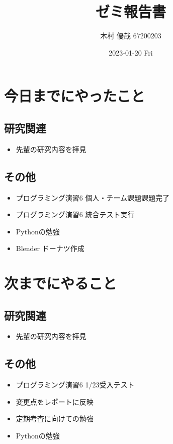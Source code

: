 \documentclass[uplatex, onecolumn, 10pt]{jsarticle}
\begin{document}
\title{\vspace{-40mm}\bf{\LARGE{ゼミ報告書}}}
\author{\vspace{-40mm}木村 優哉 67200203}
\date{2023-01-20 Fri}
\maketitle


\section{今日までにやったこと}

\subsection*{研究関連}
\begin{itemize}
	\item 先輩の研究内容を拝見
\end{itemize}

\subsection*{その他}
\begin{itemize}
	\item プログラミング演習6 個人・チーム課題課題完了
	\item プログラミング演習6 統合テスト実行
	\item Pythonの勉強
	\item Blender ドーナツ作成
\end{itemize}


\section{次までにやること}

\subsection*{研究関連}
\begin{itemize}
	\item 先輩の研究内容を拝見
\end{itemize}

\subsection*{その他}
\begin{itemize}
	\item プログラミング演習6 1/23受入テスト
	\item 変更点をレポートに反映
	\item 定期考査に向けての勉強
	\item Pythonの勉強
\end{itemize}
\end{document}
